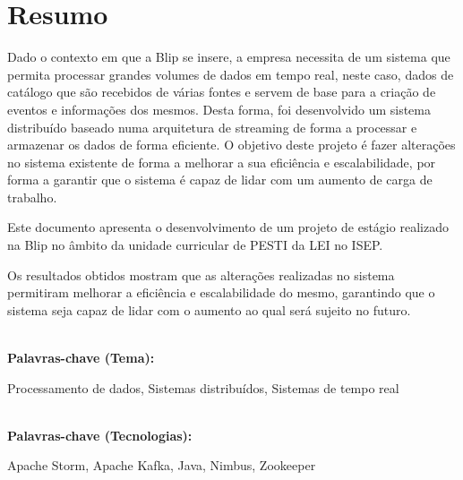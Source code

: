\titleformat{\chapter}[display]
{\normalfont\bfseries}{}{0pt}{\Huge}

\chapter*{Resumo}

Dado o contexto em que a Blip se insere, a empresa necessita de um sistema que permita processar
grandes volumes de dados em tempo real, neste caso, dados de catálogo que são recebidos de várias 
fontes e servem de base para a criação de eventos e informações dos mesmos. Desta forma, foi 
desenvolvido um sistema distribuído baseado numa arquitetura de streaming de forma a processar e 
armazenar os dados de forma eficiente. O objetivo deste projeto é fazer alterações no sistema 
existente de forma a melhorar a sua eficiência e escalabilidade, por forma a garantir que o sistema 
é capaz de lidar com um aumento de carga de  trabalho.

Este documento apresenta o desenvolvimento de um projeto de estágio realizado na Blip no âmbito da 
unidade curricular de \ac{PESTI} da \ac{LEI} no \ac{ISEP}. 

Os resultados obtidos mostram que as alterações realizadas no sistema permitiram melhorar a
eficiência e escalabilidade do mesmo, garantindo que o sistema seja capaz de lidar com o aumento
ao qual será sujeito no futuro.



\textbf{\\Palavras-chave (Tema): } 

Processamento de dados, Sistemas distribuídos, Sistemas de tempo real

\textbf{\\Palavras-chave (Tecnologias):}

Apache Storm, Apache Kafka, Java, Nimbus, Zookeeper


